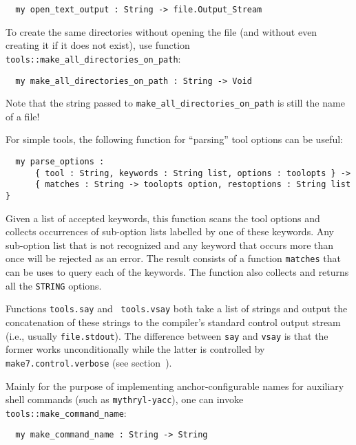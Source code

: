 \begin{verbatim}
  my open_text_output : String -> file.Output_Stream
\end{verbatim}

To create the same directories without opening the file (and without
even creating it if it does not exist), use function {\tt
tools::make_all_directories_on_path}:

\begin{verbatim}
  my make_all_directories_on_path : String -> Void
\end{verbatim}

Note that the string passed to {\tt make_all_directories_on_path}
is still the name of a file!

  For simple tools, the following
function for ``parsing'' tool options can be useful:

\begin{verbatim}
  my parse_options :
      { tool : String, keywords : String list, options : toolopts } ->
      { matches : String -> toolopts option, restoptions : String list }
\end{verbatim}

Given a list of accepted keywords, this function scans the tool
options and collects occurrences of sub-option lists labelled by one
of these keywords.  Any sub-option list that is not recognized and any
keyword that occurs more than once will be rejected as an error.  The
result consists of a function {\tt matches} that can be uses to query
each of the keywords.  The function also collects and returns all the
{\tt STRING} options.

 Functions {\tt tools.say} and {\tt
tools.vsay} both take a list of strings and output the concatenation
of these strings to the compiler's standard control output stream
(i.e., usually {\tt file.stdout}).  The difference between {\tt say}
and {\tt vsay} is that the former works unconditionally while the
latter is controlled by {\tt make7.control.verbose} (see
section~).

 Mainly for the purpose of
implementing anchor-configurable names for auxiliary shell commands
(such as {\tt mythryl-yacc}), one can invoke {\tt tools::make_command_name}:

\begin{verbatim}
  my make_command_name : String -> String
\end{verbatim}

